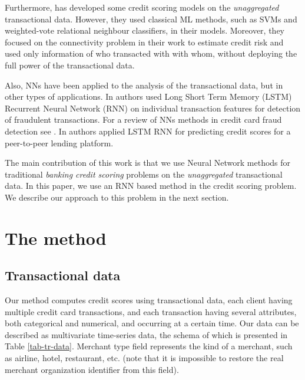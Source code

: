 \documentclass[sigconf]{acmart}
\begin{document}
Furthermore, \cite{RePEc} has developed some credit scoring models on the {\em unaggregated} transactional data. However, they used classical ML methods, such as SVMs and weighted-vote relational neighbour classifiers, in their models. Moreover, they focused on the connectivity problem in their work to estimate credit risk and used only information of who transacted with with whom, without deploying the full power of the transactional data.

Also, NNs have been applied to the analysis of the transactional data, but in other types of applications. In \cite{fraud_lstm} authors used Long Short Term Memory (LSTM) Recurrent Neural Network (RNN) \cite{gers1999learning} on individual transaction features for detection of fraudulent transactions. For a review of NNs methods in credit card fraud detection see \cite{abdallah2016fraud}. In \cite{zhang2017credit}  authors applied LSTM RNN for predicting credit scores for a peer-to-peer lending platform.

The main contribution of this work is that we use Neural Network methods for traditional {\em banking credit scoring} problems on the {\em unaggregated} transactional data.
In this paper, we use an RNN based method in the credit scoring problem. We describe our approach to this problem in the next section.

\section{The method}

\subsection{Transactional data}

Our method computes credit scores using transactional data,
each client having multiple credit card transactions, and each transaction having several attributes, both categorical and numerical, and occurring at a certain time. Our data can be described as multivariate time-series data, the schema of which is presented in Table \ref{tab-tr-data}. Merchant type field represents the kind of a merchant, such as airline, hotel, restaurant, etc. (note that it is impossible to restore the real merchant organization identifier from this field).
\end{document}
